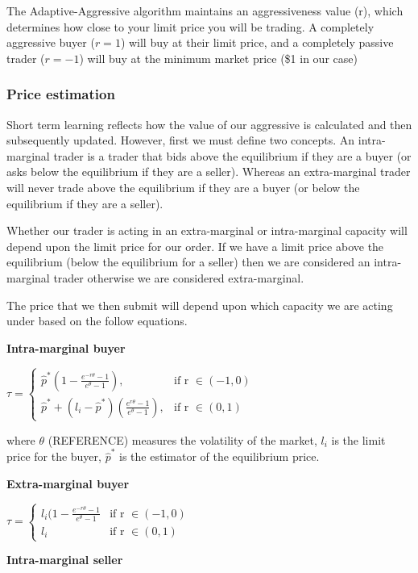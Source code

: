 \documentclass{acm_proc_article-sp}
\begin{document}
The Adaptive-Aggressive algorithm maintains an aggressiveness value (r), which
determines how close to your limit price you will be trading. A completely
aggressive buyer ($r = 1$) will buy at their limit price, and a completely
passive trader ($r = -1$) will buy at the minimum market price (\$1 in our case)

\subsubsection{Price estimation} \label{sec:AA_price_estimation}
Short term learning reflects how the value of our aggressive is calculated and
then subsequently updated. However, first we must define two concepts. An
intra-marginal trader is a trader that bids above the equilibrium if they are a
buyer (or asks below the equilibrium if they are a seller). Whereas an
extra-marginal trader will never trade above the equilibrium if they are a
buyer (or below the equilibrium if they are a seller).

Whether our trader is acting in an extra-marginal or intra-marginal capacity
will depend upon the limit price for our order. If we have a limit price above
the equilibrium (below the equilibrium for a seller) then we are considered an
intra-marginal trader otherwise we are considered extra-marginal.

The price that we then submit will depend upon which capacity we are acting
under based on the follow equations.

\textbf{Intra-marginal buyer}

$\tau =
\begin{cases}
      \hat{p}^*(1- \frac{e^{-r\theta}-1}{e^{\theta}-1}), &  \text{if r } \in (-1,0)  \\
      \hat{p}^* + (l_i-\hat{p}^*)(\frac{e^{r\theta}-1}{e^\theta-1}), & \text{if
      r } \in (0,1)
\end{cases}$

where $\theta$ (REFERENCE) measures the volatility of the
market, $l_i$ is the limit price for the buyer, $\hat{p}^*$ is the estimator of the
equilibrium price.

\textbf{Extra-marginal buyer}

$\tau =
\begin{cases}
      l_i(1-\frac{e^{-r\theta}-1}{e^\theta-1} &  \text{if r } \in (-1,0)  \\
      l_i & \text{if
      r } \in (0,1)
\end{cases}$

\textbf{Intra-marginal seller}
\end{document}
